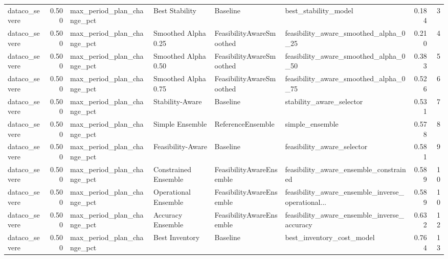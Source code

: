\begin{table}
{\begin{tabular}{lrllllrr}
 dataco\_severe &             0.500 &  max\_period\_plan\_change\_pct &        Best Stability &                  Baseline &                               best\_stability\_model &         0.184 &               3 \\
 dataco\_severe &             0.500 &  max\_period\_plan\_change\_pct &   Smoothed Alpha 0.25 &  FeasibilityAwareSmoothed &              feasibility\_aware\_smoothed\_alpha\_0\_25 &         0.210 &               4 \\
 dataco\_severe &             0.500 &  max\_period\_plan\_change\_pct &   Smoothed Alpha 0.50 &  FeasibilityAwareSmoothed &              feasibility\_aware\_smoothed\_alpha\_0\_50 &         0.383 &               5 \\
 dataco\_severe &             0.500 &  max\_period\_plan\_change\_pct &   Smoothed Alpha 0.75 &  FeasibilityAwareSmoothed &              feasibility\_aware\_smoothed\_alpha\_0\_75 &         0.526 &               6 \\
 dataco\_severe &             0.500 &  max\_period\_plan\_change\_pct &       Stability-Aware &                  Baseline &                           stability\_aware\_selector &         0.531 &               7 \\
 dataco\_severe &             0.500 &  max\_period\_plan\_change\_pct &       Simple Ensemble &         ReferenceEnsemble &                                    simple\_ensemble &         0.578 &               8 \\
 dataco\_severe &             0.500 &  max\_period\_plan\_change\_pct &     Feasibility-Aware &                  Baseline &                         feasibility\_aware\_selector &         0.581 &               9 \\
 dataco\_severe &             0.500 &  max\_period\_plan\_change\_pct &  Constrained Ensemble &  FeasibilityAwareEnsemble &             feasibility\_aware\_ensemble\_constrained &         0.589 &              10 \\
 dataco\_severe &             0.500 &  max\_period\_plan\_change\_pct &  Operational Ensemble &  FeasibilityAwareEnsemble &  feasibility\_aware\_ensemble\_inverse\_operational... &         0.589 &              10 \\
 dataco\_severe &             0.500 &  max\_period\_plan\_change\_pct &     Accuracy Ensemble &  FeasibilityAwareEnsemble &        feasibility\_aware\_ensemble\_inverse\_accuracy &         0.632 &              12 \\
 dataco\_severe &             0.500 &  max\_period\_plan\_change\_pct &        Best Inventory &                  Baseline &                          best\_inventory\_cost\_model &         0.764 &              13 \\

\end{tabular}}
\end{table}
